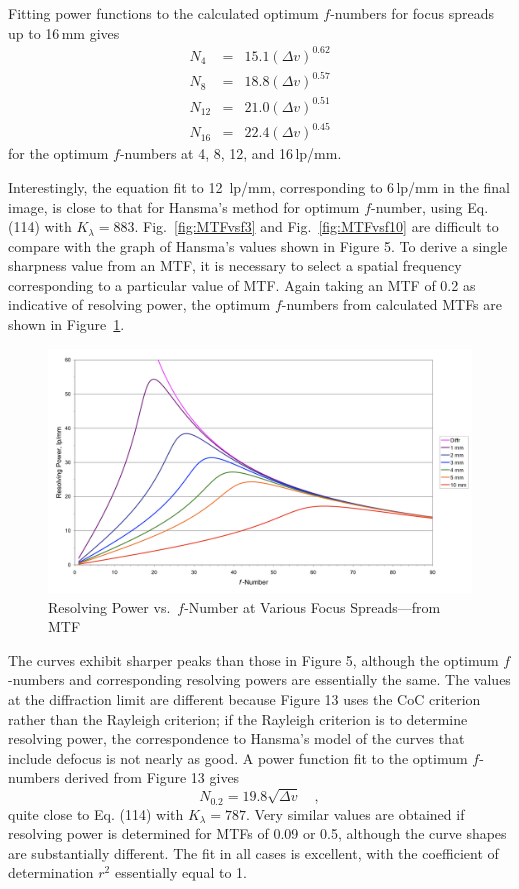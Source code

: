 \documentclass[11pt, oneside]{scrartcl}   	%
\newcommand{\Dv}{\ensuremath{\Delta v}}
\begin{document}
Fitting power functions to the calculated optimum $f$-numbers for focus spreads up to 16\,mm gives
\begin{eqnarray}
N_4 &=&15.1(\Dv)^{0.62}\\
N_8 &=&18.8(\Dv)^{0.57}\\
N_{12} &=&21.0(\Dv)^{0.51}\\
N_{16} &=&22.4(\Dv)^{0.45}
\end{eqnarray}
for the optimum $f$-numbers at 4, 8, 12, and 16\,lp/mm.

Interestingly, the equation fit to 12 \,lp/mm, corresponding to 6\,lp/mm in the final image,
is close to that for Hansma’s method for optimum $f$-number, using Eq. (114) with $K_\lambda = 883$. Fig.~\ref{fig:MTFvsf3} and Fig.~\ref{fig:MTFvsf10} are difficult to compare with the graph of Hansma’s values shown in Figure 5. To derive a single sharpness value from an MTF, it is necessary to select a spatial frequency corresponding to a particular value of MTF. Again taking an MTF of 0.2 as indicative of resolving power, the optimum $f$-numbers from calculated MTFs are shown in Figure~\ref{fig:respow}.

\begin{figure}[htbp] %
   \centering
   \includegraphics[width=\linewidth]{figure/fig_dofd_13} 
   \caption{Resolving Power vs.\ $f$-Number at Various Focus Spreads---from MTF}
   \label{fig:respow}
\end{figure}

The curves exhibit sharper peaks than those in Figure 5, although the optimum $f$-numbers and corresponding resolving powers are essentially the same. The values at the diffraction limit are different because Figure 13 uses the CoC criterion rather than the Rayleigh criterion; if the Rayleigh criterion is to determine resolving power, the correspondence to Hansma’s model of the curves that include defocus is not nearly as good. A power function fit to the optimum $f$-numbers derived from Figure 13 gives
\begin{equation}
N_{0.2} = 19.8\sqrt{\Dv}\quad,
\end{equation}
quite close to Eq. (114) with $K_\lambda = 787$. Very similar values are obtained if resolving power is determined for MTFs of 0.09 or 0.5, although the curve shapes are substantially different. The fit in all cases is excellent, with the coefficient of determination $r^2$ essentially equal to 1.
\end{document}
